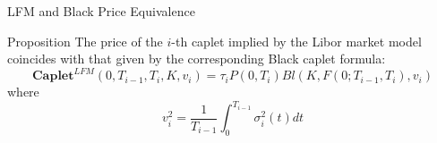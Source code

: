 \documentclass{beamer}
\begin{document}

\begin{frame}{LFM and Black Price Equivalence}
	\begin{block}{Proposition}
		The price of the $i$-th caplet implied by the Libor market model coincides with that given by the corresponding Black caplet formula:
		\begin{equation}
			\textbf{Caplet}^{LFM}(0, T_{i-1}, T_i, K, v_i)= \tau_i P(0, T_i) Bl(K, F(0; T_{i-1}, T_i), v_i)
		\end{equation}
		where
		\begin{equation}
			v_i^2 = \frac{1}{T_{i-1}}\int_0^{T_{i-1}}\sigma_i^2(t)dt
			\label{eq:caplet_black_vol}
		\end{equation}
	\end{block}
\end{frame}
\end{document}
